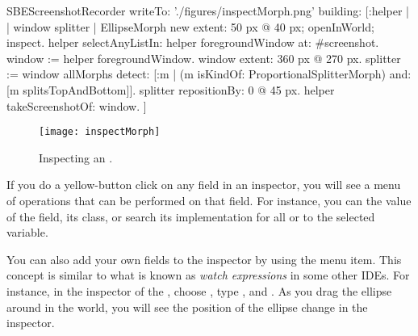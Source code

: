 \documentclass[a4paper,10pt,twoside]{book}
\begin{document}
\begin{ExecuteSmalltalkScript}
SBEScreenshotRecorder writeTo: './figures/inspectMorph.png' building: [:helper | | window splitter |
	EllipseMorph new extent: 50 px @ 40 px; openInWorld; inspect.
	helper selectAnyListIn: helper foregroundWindow at: #screenshot.
	window := helper foregroundWindow.
	window extent: 360 px @ 270 px.
	splitter := window allMorphs detect: [:m |
		(m isKindOf: ProportionalSplitterMorph) and: [m splitsTopAndBottom]].
	splitter repositionBy: 0 @ 45 px.
	helper takeScreenshotOf: window.
]
\end{ExecuteSmalltalkScript}

\begin{figure}[btp]
	\begin{center}
		\texttt{[image: inspectMorph]}
	\end{center}
	\caption{Inspecting an .}
	\label{fig:inspectMorph}
\end{figure}

If you do a yellow-button click on any field in an inspector, you will see a menu of operations that can be performed on that field.
For instance, you can  the value of the field,  its class, or search its implementation for all  or  to the selected variable.

You can also add your own fields to the inspector by using the  menu item.
This concept is similar to what is known as \emph{watch expressions} in some other IDEs.
For instance, in the inspector of the , choose , type , and .
As you drag the ellipse around in the world, you will see the position of the ellipse change in the inspector.
\end{document}
